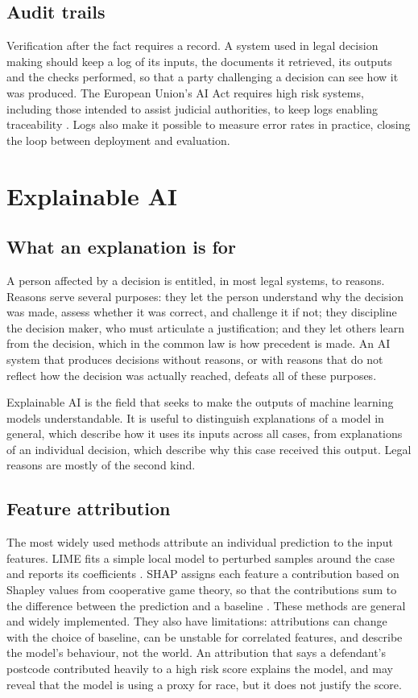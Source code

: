 \subsection{Audit trails}

Verification after the fact requires a record. A system used in legal decision making should keep a log of its inputs, the documents it retrieved, its outputs and the checks performed, so that a party challenging a decision can see how it was produced. The European Union's AI Act requires high risk systems, including those intended to assist judicial authorities, to keep logs enabling traceability \citep{euaiact2024}. Logs also make it possible to measure error rates in practice, closing the loop between deployment and evaluation.

\section{Explainable AI}

\subsection{What an explanation is for}

A person affected by a decision is entitled, in most legal systems, to reasons. Reasons serve several purposes: they let the person understand why the decision was made, assess whether it was correct, and challenge it if not; they discipline the decision maker, who must articulate a justification; and they let others learn from the decision, which in the common law is how precedent is made. An AI system that produces decisions without reasons, or with reasons that do not reflect how the decision was actually reached, defeats all of these purposes.

Explainable AI is the field that seeks to make the outputs of machine learning models understandable. It is useful to distinguish explanations of a model in general, which describe how it uses its inputs across all cases, from explanations of an individual decision, which describe why this case received this output. Legal reasons are mostly of the second kind.

\subsection{Feature attribution}

The most widely used methods attribute an individual prediction to the input features. LIME fits a simple local model to perturbed samples around the case and reports its coefficients \citep{ribeiro2016}. SHAP assigns each feature a contribution based on Shapley values from cooperative game theory, so that the contributions sum to the difference between the prediction and a baseline \citep{lundberg2017}. These methods are general and widely implemented. They also have limitations: attributions can change with the choice of baseline, can be unstable for correlated features, and describe the model's behaviour, not the world. An attribution that says a defendant's postcode contributed heavily to a high risk score explains the model, and may reveal that the model is using a proxy for race, but it does not justify the score.

